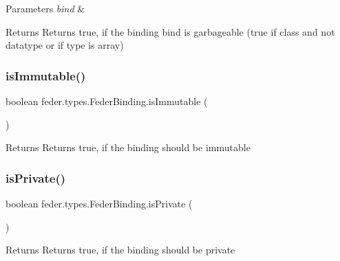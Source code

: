 \begin{DoxyParams}{Parameters}
{\em bind} & \\
\hline
\end{DoxyParams}
\begin{DoxyReturn}{Returns}
Returns true, if the binding \textquotesingle{}bind\textquotesingle{} is garbageable (true if class and not datatype or if type is array) 
\end{DoxyReturn}
\mbox{\label{classfeder_1_1types_1_1FederBinding_a84df88cf32e2d678fc73f8e868477487}} 
\subsubsection{\texorpdfstring{is\+Immutable()}{isImmutable()}}
{\footnotesize\ttfamily boolean feder.\+types.\+Feder\+Binding.\+is\+Immutable (\begin{DoxyParamCaption}{ }\end{DoxyParamCaption})}

\begin{DoxyReturn}{Returns}
Returns true, if the binding should be immutable 
\end{DoxyReturn}
\mbox{\label{classfeder_1_1types_1_1FederBinding_ad5937fb65ae2d25cc075dcf639dcfe04}} 
\subsubsection{\texorpdfstring{is\+Private()}{isPrivate()}}
{\footnotesize\ttfamily boolean feder.\+types.\+Feder\+Binding.\+is\+Private (\begin{DoxyParamCaption}{ }\end{DoxyParamCaption})}

\begin{DoxyReturn}{Returns}
Returns true, if the binding should be private 
\end{DoxyReturn}
\mbox{\label{classfeder_1_1types_1_1FederBinding_a8c895588a1ab8067b5697ff5c9608fa5}} 
